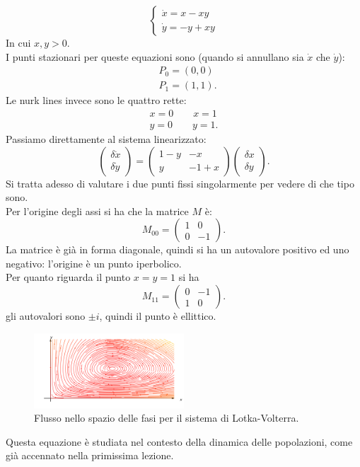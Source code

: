 \noindent
\begin{exmp}
    \[
        \begin{cases}
	    \dot{x} = x - xy\\
	    \dot{y} = - y + xy
        \end{cases}
    \] 
    In cui $x, y > 0$. \\
    I punti stazionari per queste equazioni sono (quando si annullano sia $\dot{x}$ che $\dot{y}$):
    \[\begin{aligned}
	& P_0 = (0,0) \\
	& P_1 = (1,1) 
    .\end{aligned}\]
    Le nurk lines invece sono le quattro rette:
    \[\begin{aligned}
        x = 0 \qquad x = 1\\
	y = 0 \qquad y = 1
    .\end{aligned}\]
    Passiamo direttamente al sistema linearizzato:
    \[
        \begin{pmatrix} \delta\dot{x} \\ \delta\dot{y} \end{pmatrix} =
	\begin{pmatrix} 
	  1-y & -x \\
          y & -1+x
        \end{pmatrix} 
	\begin{pmatrix} \delta x \\ \delta y \end{pmatrix} 
    .\] 
    Si tratta adesso di valutare i due punti fissi singolarmente per vedere di che tipo sono.\\
    Per l'origine degli assi si ha che la matrice $M$ è:
    \[
	M_{00} = 
        \begin{pmatrix} 
	1 & 0\\
        0 & -1
        \end{pmatrix} 
    .\] 
    La matrice è già in forma diagonale, quindi si ha un autovalore positivo ed uno negativo: l'origine è un punto iperbolico.\\
    Per quanto riguarda il punto $x=y=1$ si ha
    \[
	M_{11} = 
        \begin{pmatrix} 
	0 & -1\\
        1 & 0
        \end{pmatrix} 
    .\] 
    gli autovalori sono $\pm i$, quindi il punto è ellittico.
    \begin{figure}[H]
        \centering
	\includegraphics[width=0.5\textwidth]{figures/15_volterra.png}
        \caption{\scriptsize Flusso nello spazio delle fasi per il sistema di Lotka-Volterra.}
        \label{fig:figures-15_volterra-png}
    \end{figure}
    Questa equazione è studiata nel contesto della dinamica delle popolazioni, come già accennato nella primissima lezione.
\end{exmp}

